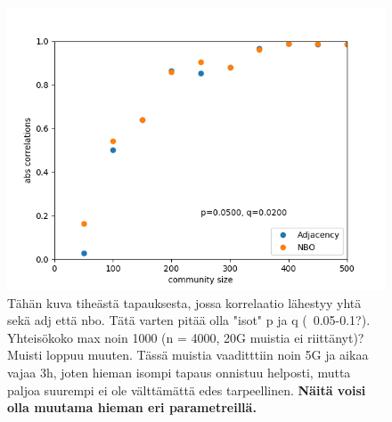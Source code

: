 \documentclass[finnish,12pt,a4paper,pdftex,sci,utf8]{aaltothesis}
\begin{document}
\begin{figure}
	\centering
	\includegraphics{adj_nbo_den_1.png}
	\caption{Tähän kuva tiheästä tapauksesta, jossa korrelaatio lähestyy yhtä sekä adj että nbo. Tätä varten pitää olla "isot" p ja q (~0.05-0.1?). Yhteisökoko max noin 1000 (n = 4000, 20G muistia ei riittänyt)? Muisti loppuu muuten. Tässä muistia vaaditttiin noin 5G ja aikaa vajaa 3h, joten hieman isompi tapaus onnistuu helposti, mutta paljoa suurempi ei ole välttämättä edes tarpeellinen. \textbf{Näitä voisi olla muutama hieman eri parametreillä.}}
	\label{fig:dense}
\end{figure}
\end{document}

